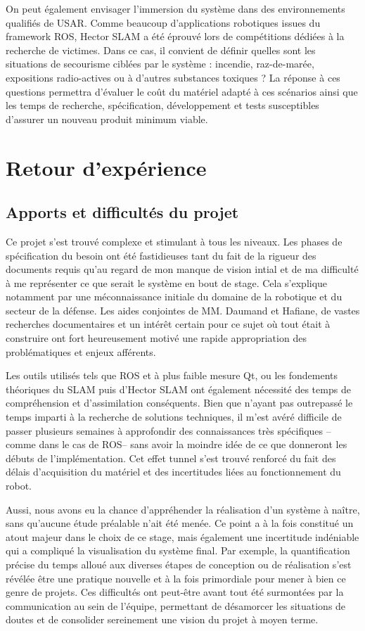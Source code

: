   On peut également envisager l'immersion du système dans des environnements qualifiés de \gls{USAR}.  
  Comme beaucoup d'applications robotiques issues du framework ROS, \gls{Hector SLAM} a été éprouvé lors de compétitions dédiées à la recherche de victimes. 
  Dans ce cas, il convient de définir quelles sont les situations de secourisme ciblées par le système : incendie, raz-de-marée, expositions radio-actives ou à d'autres substances toxiques ? 
  La réponse à ces questions permettra d'évaluer le coût du matériel adapté à ces scénarios ainsi que les temps de recherche, spécification, développement et tests susceptibles d'assurer un nouveau produit minimum viable. 
  
\section{Retour d'expérience}
  \subsection{Apports et difficultés du projet}
  
  Ce projet s'est trouvé complexe et stimulant à tous les niveaux. 
  Les phases de spécification du besoin ont été fastidieuses tant du fait de la rigueur des documents requis qu'au regard de mon manque de vision intial et de ma difficulté à me représenter ce que serait le système en bout de stage. 
  Cela s'explique notamment par une méconnaissance initiale du domaine de la robotique et du secteur de la défense.
  Les aides conjointes de MM. Daumand et Hafiane, de vastes recherches documentaires et un intérêt certain pour ce sujet où tout était à construire ont fort heureusement motivé une rapide appropriation des problématiques et enjeux afférents. 
  
  Les outils utilisés tels que ROS et à plus faible mesure Qt, ou les fondements théoriques du SLAM puis d'Hector SLAM ont également nécessité des temps de compréhension et d'assimilation conséquents. 
  Bien que n'ayant pas outrepassé le temps imparti à la recherche de solutions techniques, il m'est avéré difficile de passer plusieurs semaines à approfondir des connaissances très spécifiques --comme dans le cas de ROS-- sans 
  avoir la moindre idée de ce que donneront les débuts de l'implémentation. 
  Cet effet tunnel s'est trouvé renforcé du fait des délais d'acquisition du matériel et des incertitudes liées au fonctionnement du robot. 
  
  Aussi, nous avons eu la chance d'appréhender la réalisation d'un système à naître, sans qu'aucune étude préalable n'ait été menée. 
  Ce point a à la fois constitué un atout majeur dans le choix de ce stage, mais également une incertitude indéniable qui a compliqué la visualisation du système final. 
  Par exemple, la quantification précise du temps alloué aux diverses étapes de conception ou de réalisation s'est révélée être une pratique nouvelle et à la fois primordiale pour mener à bien ce genre de projets. 
  Ces difficultés ont peut-être avant tout été surmontées par la communication au sein de l'équipe, permettant de désamorcer les situations de doutes et de consolider sereinement une vision du projet à moyen terme. 
  
